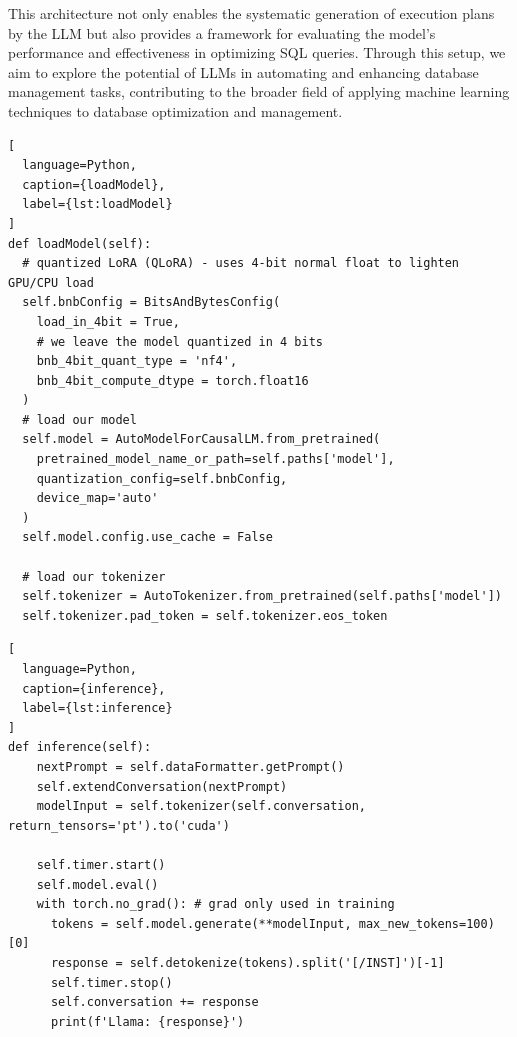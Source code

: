 This architecture not only enables the systematic generation of execution plans by the LLM but also provides a framework for evaluating the model's performance and effectiveness in optimizing SQL queries. Through this setup, we aim to explore the potential of LLMs in automating and enhancing database management tasks, contributing to the broader field of applying machine learning techniques to database optimization and management.

\begin{lstlisting}[
  language=Python,
  caption={loadModel},
  label={lst:loadModel}
]
def loadModel(self):
  # quantized LoRA (QLoRA) - uses 4-bit normal float to lighten GPU/CPU load
  self.bnbConfig = BitsAndBytesConfig(
    load_in_4bit = True,
    # we leave the model quantized in 4 bits
    bnb_4bit_quant_type = 'nf4',
    bnb_4bit_compute_dtype = torch.float16
  )
  # load our model
  self.model = AutoModelForCausalLM.from_pretrained(
    pretrained_model_name_or_path=self.paths['model'],
    quantization_config=self.bnbConfig,
    device_map='auto'
  )
  self.model.config.use_cache = False

  # load our tokenizer
  self.tokenizer = AutoTokenizer.from_pretrained(self.paths['model'])
  self.tokenizer.pad_token = self.tokenizer.eos_token
\end{lstlisting}

\begin{lstlisting}[
  language=Python,
  caption={inference},
  label={lst:inference}
]
def inference(self):
    nextPrompt = self.dataFormatter.getPrompt()
    self.extendConversation(nextPrompt)
    modelInput = self.tokenizer(self.conversation, return_tensors='pt').to('cuda')

    self.timer.start()
    self.model.eval()
    with torch.no_grad(): # grad only used in training
      tokens = self.model.generate(**modelInput, max_new_tokens=100)[0]
      response = self.detokenize(tokens).split('[/INST]')[-1]
      self.timer.stop()
      self.conversation += response
      print(f'Llama: {response}')
\end{lstlisting}

